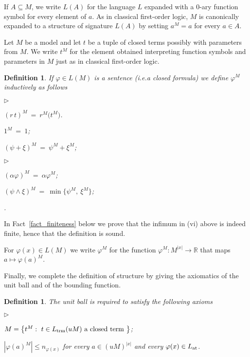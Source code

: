 \documentclass[12pt,letterpaper,oneside,reqno]{amsart}
\newcommand{\mylabel}[1]{{#1}\hfill}
\renewenvironment{itemize}
  {\begin{list}{$\triangleright$}{%
   \setlength{\parskip}{0mm}
   \setlength{\topsep}{.2\baselineskip}
   \setlength{\rightmargin}{0mm}
   \setlength{\listparindent}{0mm}
   \setlength{\itemindent}{0mm}
   \setlength{\labelwidth}{3ex}
   \setlength{\itemsep}{.2\baselineskip}
   \setlength{\parsep}{.2\baselineskip}
   \setlength{\partopsep}{0mm}
   \setlength{\labelsep}{1ex}
   \setlength{\leftmargin}{\labelwidth+\labelsep}
   \let\makelabel\mylabel}}{%
   \end{list}}
\theoremstyle{plain}
\newtheorem{definition}[theorem]{Definition}
\theoremstyle{remark}
\begin{document}
If $A\subseteq M$, we write $L(A)$ for the language $L$ expanded with a $0$-ary function symbol for every element of $a$.
As in classical first-order logic, $M$ is canonically expanded to a structure of signature $L(A)$ by setting $a^M=a$ for every $a\in A$.

Let $M$ be a model and let $t$ be a tuple of closed terms possibly with parameters from $M$.
We write $t^M$ for the element obtained interpreting function symbols and parameters in $M$ just as in classical first-order logic.

\begin{definition}\label{def_semantic}
  If $\varphi\in L(M)$ is a sentence (i.e.\@ a closed formula) we define $\varphi^M$ inductively as follows
  
  \begin{minipage}[t]{.4\textwidth}
  \begin{itemize}
  \item[i.] $(r\,t)^M\ =\  r^M\big(t^M\big)$.
  \item[ii.] $1^M\ =\ 1$;
  \item[iii.] $(\psi+\xi)^M\ =\ \psi^M+\xi^M$;
  \end{itemize}
  \end{minipage}
  \begin{minipage}[t]{.59\textwidth}
  \begin{itemize}
  \item[iv.] $(\alpha\varphi)^M\ =\ \alpha\varphi^M$;
  \item[v.] $(\psi\wedge\xi)^M\ =\ \min\big\{\psi^M,\ \xi^M\big\}$; 
  \item[vi.]  \noindent{}.
  \end{itemize}
  \end{minipage}
  \end{definition}
  \medskip

In Fact~\ref{fact_finiteness} below we prove that the infimum in (vi) above is indeed finite, hence that the definition is sound.

For $\varphi(x)\in L(M)$ we write $\varphi^M$ for the function $\varphi^M:M^{|x|}\to{\mathds R}$ that maps $a\mapsto\varphi(a)^M$.

Finally, we complete the definition of structure by giving the axiomatics of the unit ball and of the bounding function.

\begin{definition}\label{def_unitball}
  The unit ball is required to satisfy the following axioms 
  \begin{itemize}
  \item[1.] $M=\big\{t^M:\ t\in L_{\rm trm}(uM) \textrm{ a closed term }\big\}$;
  \item[2.] $|\varphi(a)^M|\le n_{\varphi(x)}$ for every $a\in (uM)^{|x|}$ and every $\varphi(x)\in L_{\rm at}$.
  \end{itemize}
\end{definition}
\end{document}
